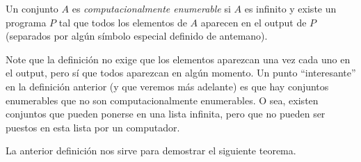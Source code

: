 \begin{definicion}
Un conjunto $A$ es \emph{computacionalmente enumerable} si $A$ es infinito y existe un programa $P$ tal que todos los elementos de $A$ aparecen en el output de $P$ (separados por algún símbolo especial definido de antemano).
\end{definicion}

Note que la definición no exige que los elementos aparezcan una vez cada uno en el output, pero sí que todos aparezcan en algún momento.
Un punto ``interesante'' en la definición anterior (y que veremos más adelante) es que hay conjuntos enumerables que no son computacionalmente enumerables. O sea, existen conjuntos que pueden ponerse en una lista infinita, pero que no pueden ser puestos en esta lista por un computador.


La anterior definición nos sirve para demostrar el siguiente teorema.

